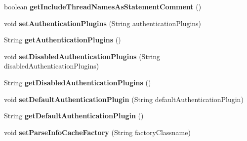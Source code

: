 \begin{DoxyCompactItemize}
boolean {\bfseries get\+Include\+Thread\+Names\+As\+Statement\+Comment} ()
\item 
\mbox{\label{classcom_1_1mysql_1_1jdbc_1_1_connection_properties_impl_a70f54a45f00093deaf96ffe75905868e}} 
void {\bfseries set\+Authentication\+Plugins} (String authentication\+Plugins)
\item 
\mbox{\label{classcom_1_1mysql_1_1jdbc_1_1_connection_properties_impl_a03769d86a1a9c5d78fc651a1bd4d90ac}} 
String {\bfseries get\+Authentication\+Plugins} ()
\item 
\mbox{\label{classcom_1_1mysql_1_1jdbc_1_1_connection_properties_impl_a7aa01d304bad810e3ecc6ab4094a2707}} 
void {\bfseries set\+Disabled\+Authentication\+Plugins} (String disabled\+Authentication\+Plugins)
\item 
\mbox{\label{classcom_1_1mysql_1_1jdbc_1_1_connection_properties_impl_ab98934343f0c38e5122eddf089010604}} 
String {\bfseries get\+Disabled\+Authentication\+Plugins} ()
\item 
\mbox{\label{classcom_1_1mysql_1_1jdbc_1_1_connection_properties_impl_a42167ea921c530ea4303c6d1ceb35251}} 
void {\bfseries set\+Default\+Authentication\+Plugin} (String default\+Authentication\+Plugin)
\item 
\mbox{\label{classcom_1_1mysql_1_1jdbc_1_1_connection_properties_impl_aeebc701652a36ef08c8ed1dfa4ad1f44}} 
String {\bfseries get\+Default\+Authentication\+Plugin} ()
\item 
\mbox{\label{classcom_1_1mysql_1_1jdbc_1_1_connection_properties_impl_a853f4887b4887707f4d5e7d97bc8f8e9}} 
void {\bfseries set\+Parse\+Info\+Cache\+Factory} (String factory\+Classname)
\item 
\mbox{\label{classcom_1_1mysql_1_1jdbc_1_1_connection_properties_impl_ae8a9f13f84b86ff12219b8be7af5dfe7}} 

\end{DoxyCompactItemize}
